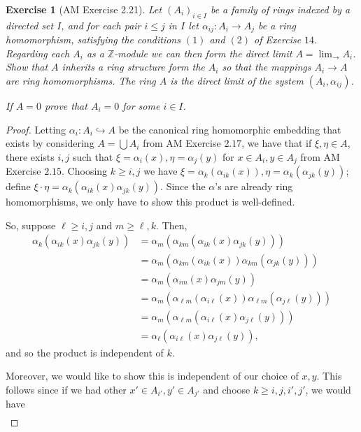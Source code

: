 \documentclass[12pt,letterpaper]{article}
\newtheorem{problem}{Exercise}[section]
\theoremstyle{definition}
\theoremstyle{remark}
\numberwithin{figure}{problem}
\numberwithin{equation}{section}
\begin{document}
\begin{problem}[AM Exercise 2.21]
  Let $(A_i)_{i \in I}$ be a family of rings indexed by a directed set $I$, and for each pair $i \le j$ in $I$ let $\alpha_{ij} : A_i \to A_j$ be a ring homomorphism, satisfying the conditions $(1)$ and $(2)$ of Exercise $14$. Regarding each $A_i$ as a $\mathbb{Z}$-module we can then form the direct limit $A = \displaystyle\lim_{\longrightarrow} A_i$. Show that $A$ inherits a ring structure form the $A_i$ so that the mappings $A_i \to A$ are ring homomorphisms. The ring $A$ is the \emph{direct limit} of the system $(A_i,\alpha_{ij})$.
  \par If $A=0$ prove that $A_i = 0$ for some $i \in I$.
\end{problem}
\begin{proof}
  Letting $\alpha_i : A_i \hookrightarrow A$ be the canonical ring homomorphic embedding that exists by considering $A = \bigcup A_i$ from AM Exercise $2.17$, we have that if $\xi,\eta \in A$, there exists $i,j$ such that $\xi = \alpha_i(x), \eta = \alpha_j(y)$ for $x \in A_i, y \in A_j$ from AM Exercise $2.15$. Choosing $k \geqslant i,j$ we have $\xi = \alpha_k(\alpha_{ik}(x)), \eta = \alpha_k(\alpha_{jk}(y))$; define $\xi\cdot\eta = \alpha_k(\alpha_{ik}(x)\alpha_{jk}(y))$. Since the $\alpha$'s are already ring homomorphisms, we only have to show this product is well-defined.
  \par So, suppose $\ell \geqslant i,j$ and $m \geqslant \ell,k$. Then,
  \begin{align*}
    \alpha_k(\alpha_{ik}(x)\alpha_{jk}(y)) &= \alpha_m(\alpha_{km}(\alpha_{ik}(x)\alpha_{jk}(y)))\\
    &= \alpha_m(\alpha_{km}(\alpha_{ik}(x))\alpha_{km}(\alpha_{jk}(y)))\\
    &= \alpha_m(\alpha_{im}(x)\alpha_{jm}(y))\\
    &= \alpha_m(\alpha_{\ell m}(\alpha_{i\ell}(x))\alpha_{\ell m}(\alpha_{j\ell}(y)))\\
    &= \alpha_m(\alpha_{\ell m}(\alpha_{i\ell}(x)\alpha_{j\ell}(y)))\\
    &= \alpha_\ell(\alpha_{i\ell}(x)\alpha_{j\ell}(y)),
  \end{align*}
  and so the product is independent of $k$.
  \par Moreover, we would like to show this is independent of our choice of $x,y$. This follows since if we had other $x' \in A_{i'}, y' \in A_{j'}$ and choose $k \geqslant i,j,i',j'$, we would have
  \begin{multline*}

\end{multline*}
\end{proof}
\end{document}
